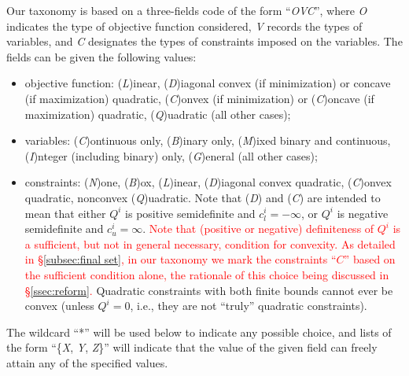 Our taxonomy is based on a three-fields code of the form ``\textit{OVC}'', where \textit{O} indicates the type of objective function considered, \textit{V} records the types of variables, and \textit{C} designates the types of constraints imposed on the variables. The fields can be given the following values:
%
\begin{itemize}
 \item objective function: (\textit{L})inear, (\textit{D})iagonal convex (if minimization) or concave (if maximization) quadratic, (\textit{C})onvex (if minimization) or (\textit{C})oncave (if maximization) quadratic,  (\textit{Q})uadratic (all other cases);
 \item variables: (\textit{C})ontinuous only, (\textit{B})inary only, (\textit{M})ixed binary and continuous, (\textit{I})nteger (including binary) only, (\textit{G})eneral (all other cases);
 \item constraints: (\textit{N})one, (\textit{B})ox, (\textit{L})inear, (\textit{D})iagonal convex quadratic, (\textit{C})on\-vex quadratic, nonconvex (\textit{Q})uadratic.
  Note that (\textit{D}) and (\textit{C}) are intended to mean that either $Q^i$ is positive semidefinite and $c_l^i = -\infty$, or $Q^i$ is negative semidefinite and $c_u^i = \infty$. 
    \textcolor{red}{Note that (positive or negative) definiteness of $Q^i$ is a sufficient, but not in general necessary, condition for convexity. As detailed in \S\ref{subsec:final set}, in our taxonomy we mark the constraints ``$C$'' based on the sufficient condition alone, the rationale of this choice being discussed in \S\ref{ssec:reform}.}
  Quadratic constraints with both finite bounds cannot ever be convex (unless $Q^i = 0$, i.e., they are not ``truly'' quadratic constraints).
\end{itemize}
%
The wildcard ``*'' will be used below to indicate any possible choice, and lists of the form ``\{\textit{X}, \textit{Y}, \textit{Z}\}'' will indicate that the value of the given field can freely attain any of the specified values.

